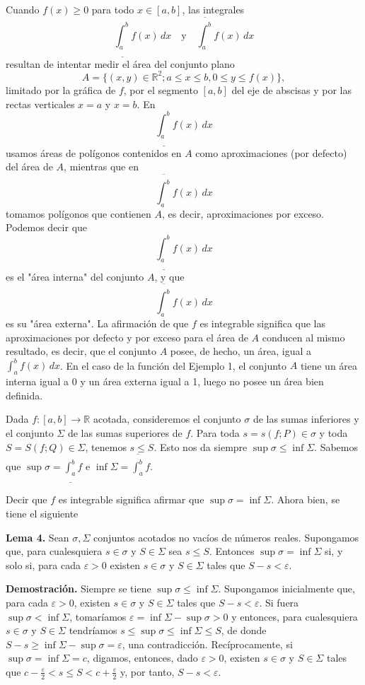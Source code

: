 \documentclass[12pt,oneside]{book}
\begin{document}
Cuando \(f(x) \geq 0\) para todo \(x \in [a, b]\), las integrales
\[
\underline{\int_a^b} f(x) \, dx
\quad \text{y} \quad
\overline{\int_a^b} f(x) \, dx
\]
resultan de intentar medir el área del conjunto plano
\[
A = \{(x, y) \in \mathbb{R}^2; a \leq x \leq b, 0 \leq y \leq f(x)\},
\]
limitado por la gráfica de \(f\), por el segmento \([a, b]\) del eje de abscisas y por las rectas verticales \(x = a\) y \(x = b\). En
\[
\underline{\int_a^b} f(x) \, dx
\]
usamos áreas de polígonos contenidos en \(A\) como aproximaciones (por defecto) del área de \(A\), mientras que en
\[
\overline{\int_a^b} f(x) \, dx
\]
tomamos polígonos que contienen \(A\), es decir, aproximaciones por exceso. Podemos decir que
\[
\underline{\int_a^b} f(x) \, dx
\]
es el "área interna" del conjunto \(A\), y que
\[
\overline{\int_a^b} f(x) \, dx
\]
es su "área externa". La afirmación de que \(f\) es integrable significa que las aproximaciones por defecto y por exceso para el área de \(A\) conducen al mismo resultado, es decir, que el conjunto \(A\) posee, de hecho, un área, igual a \(\int_a^b f(x) \, dx\). En el caso de la función del Ejemplo 1, el conjunto \(A\) tiene un área interna igual a 0 y un área externa igual a 1, luego no posee un área bien definida.

Dada \(f: [a, b] \to \mathbb{R}\) acotada, consideremos el conjunto \(\sigma\) de las sumas inferiores y el conjunto \(\Sigma\) de las sumas superiores de \(f\). Para toda \(s = s(f; P) \in \sigma\) y toda \(S = S(f; Q) \in \Sigma\), tenemos \(s \leq S\). Esto nos da siempre \(\sup \sigma \leq \inf \Sigma\). Sabemos que \(\sup \sigma = \underline{\int_a^b} f\) e \(\inf \Sigma = \overline{\int_a^b} f\).

Decir que \(f\) es integrable significa afirmar que \(\sup \sigma = \inf \Sigma\). Ahora bien, se tiene el siguiente

\textbf{Lema 4.} Sean \(\sigma, \Sigma\) conjuntos acotados no vacíos de números reales. Supongamos que, para cualesquiera \(s \in \sigma\) y \(S \in \Sigma\) sea \(s \leq S\). Entonces \(\sup \sigma = \inf \Sigma\) si, y solo si, para cada \(\varepsilon > 0\) existen \(s \in \sigma\) y \(S \in \Sigma\) tales que \(S - s < \varepsilon\).

\textbf{Demostración.} Siempre se tiene \(\sup \sigma \leq \inf \Sigma\). Supongamos inicialmente que, para cada \(\varepsilon > 0\), existen \(s \in \sigma\) y \(S \in \Sigma\) tales que \(S - s < \varepsilon\). Si fuera \(\sup \sigma < \inf \Sigma\), tomaríamos \(\varepsilon = \inf \Sigma - \sup \sigma > 0\) y entonces, para cualesquiera \(s \in \sigma\) y \(S \in \Sigma\) tendríamos \(s \leq \sup \sigma \leq \inf \Sigma \leq S\), de donde \(S - s \geq \inf \Sigma - \sup \sigma = \varepsilon\), una contradicción. Recíprocamente, si \(\sup \sigma = \inf \Sigma = c\), digamos, entonces, dado \(\varepsilon > 0\), existen \(s \in \sigma\) y \(S \in \Sigma\) tales que \(c - \frac{\varepsilon}{2} < s \leq S < c + \frac{\varepsilon}{2}\) y, por tanto, \(S - s < \varepsilon\).
\end{document}
